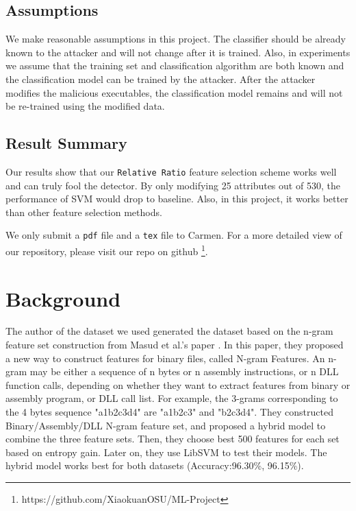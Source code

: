 \documentclass[11pt]{article}
\begin{document}
\subsection{Assumptions} \label{sec:assumption}
We make reasonable assumptions in this project. The classifier should be already known to the attacker and will not change after it is trained. Also, in experiments we assume that the training set and classification algorithm are both known and the classification model can be trained by the attacker. After the attacker modifies the malicious executables, the classification model remains and will not be re-trained using the modified data.


\subsection{Result Summary}
Our results show that our \texttt{Relative Ratio} feature selection scheme works well and can truly fool the detector. By only modifying 25 attributes out of 530, the performance of SVM would drop to baseline. Also, in this project, it works better than other feature selection methods.

We only submit a \texttt{pdf} file and a \texttt{tex} file to Carmen. For a more detailed view of our repository, please visit our repo on github \footnote{https://github.com/XiaokuanOSU/ML-Project}.

\section{Background}
The author of the dataset we used generated the dataset based on the n-gram feature set construction from Masud et al.'s paper \cite{masud2007hybrid}. In this paper, they proposed a new way to construct features for binary files, called N-gram Features. An n-gram may be either a sequence of n bytes or n assembly instructions, or n DLL function calls, depending on whether they want to extract features from binary or assembly program, or DLL call list. For example, the 3-grams corresponding to the 4 bytes sequence "a1b2c3d4" are "a1b2c3" and "b2c3d4". They constructed Binary/Assembly/DLL N-gram feature set, and proposed a hybrid model to combine the three feature sets. Then, they choose best 500 features for each set based on entropy gain. Later on, they use LibSVM to test their models. The hybrid model works best for both datasets (Accuracy:96.30\%, 96.15\%).
\end{document}
